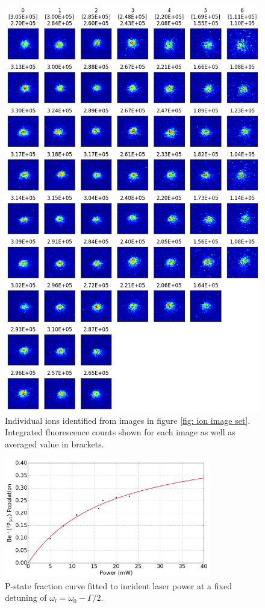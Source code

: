 \newpage
\begin{figure}[H]
	\centering
	\includegraphics[height=0.7\paperheight]{images/isolated_ions.png}
	\caption{Individual ions identified from images in figure \ref{fig: ion image set}. Integrated fluorescence counts shown for each image as well as averaged value in brackets.}
\end{figure}

\begin{figure}[H]
	\centering
	\includegraphics[width=0.8\textwidth]{images/P_state_curve.png}
	\caption{P-state fraction curve fitted to incident laser power at a fixed detuning of $\omega_l = \omega_0 - \Gamma/2$.}
\end{figure}